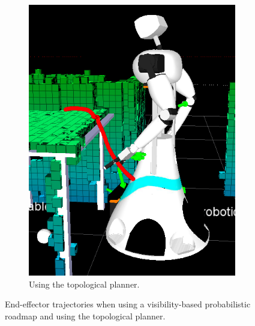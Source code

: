 \begin{figure}[ht]
\begin{subfigure}[t]{0.48\linewidth}
        \includegraphics[width = 0.9\linewidth]{pics/Screenshot20140123_145234_crop.png}
        \caption{Using the topological planner.}
        \label{wbp:fig:rviz_grasp_topological}
    \end{subfigure}
    \caption{End-effector trajectories when using a visibility-based probabilistic roadmap and using the topological planner.}
    \label{wbp:fig:rviz_grasp}
\end{figure}
%


